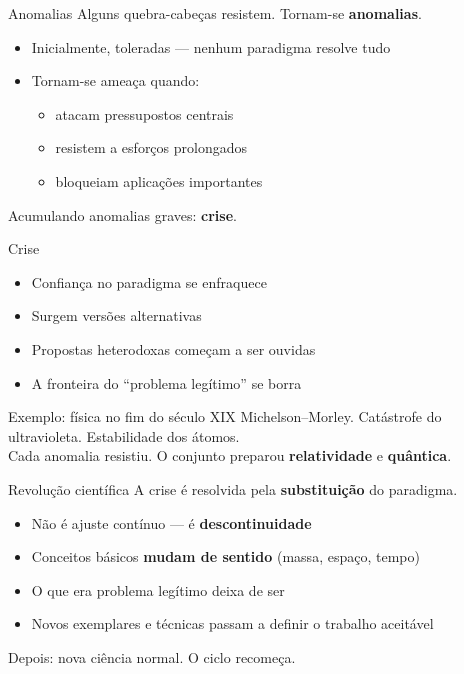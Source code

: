 \documentclass[aspectratio=169]{beamer}
\newcommand{\impt}[1]{\textcolor{maccent}{\textbf{#1}}}
\newcommand{\ntc}[1]{\textcolor{mprimary}{#1}}
\begin{document}
\begin{frame}{Anomalias}
Alguns quebra-cabeças resistem. Tornam-se \impt{anomalias}.
\vspace{0.3cm}
\pause
\begin{itemize}
  \item Inicialmente, \ntc{toleradas} --- nenhum paradigma resolve tudo
  \pause
  \item Tornam-se ameaça quando:
  \begin{itemize}
    \item atacam pressupostos centrais
    \item resistem a esforços prolongados
    \item bloqueiam aplicações importantes
  \end{itemize}
\end{itemize}
\vspace{0.4cm}
\pause
\begin{block}{}
Acumulando anomalias graves: \impt{crise}.
\end{block}
\end{frame}

\begin{frame}{Crise}
\begin{itemize}
  \item Confiança no paradigma se enfraquece
  \pause
  \item Surgem versões alternativas
  \pause
  \item Propostas heterodoxas começam a ser ouvidas
  \pause
  \item A fronteira do ``problema legítimo'' se borra
\end{itemize}
\vspace{0.4cm}
\pause
\begin{block}{Exemplo: física no fim do século XIX}
Michelson--Morley. Catástrofe do ultravioleta. Estabilidade dos átomos. \\[0.15cm]
Cada anomalia resistiu. O conjunto preparou \impt{relatividade} e \impt{quântica}.
\end{block}
\end{frame}

\begin{frame}{Revolução científica}
A crise é resolvida pela \impt{substituição} do paradigma.
\vspace{0.3cm}
\pause
\begin{itemize}
  \item Não é ajuste contínuo --- é \impt{descontinuidade}
  \pause
  \item Conceitos básicos \impt{mudam de sentido} (massa, espaço, tempo)
  \pause
  \item O que era problema legítimo deixa de ser
  \pause
  \item Novos exemplares e técnicas passam a definir o trabalho aceitável
\end{itemize}
\vspace{0.4cm}
\pause
\ntc{Depois:} nova ciência normal. O ciclo recomeça.
\end{frame}
\end{document}
